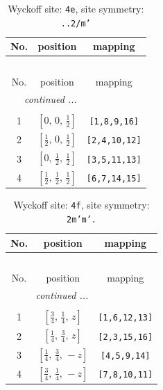 \documentclass[fleqn,8pt]{jsarticle}
\begin{document}
\begin{longtable}{ccc}
\caption{Wyckoff site: {\tt 4e}, site symmetry: {\tt ..2/m'}}
 \\
 \hline \hline
No. & position & mapping \\ \hline \endfirsthead

\multicolumn{2}{l}{\tablename\ \thetable{}} \\
 \hline \hline
No. & position & mapping \\ \hline \endhead

 \hline \hline
\multicolumn{2}{r}{\footnotesize\it continued ...} \\ \endfoot

 \hline \hline
\multicolumn{2}{r}{} \\ \endlastfoot

1 & $\left[ 0,\, 0,\, \frac{1}{2} \right]$ & {\tt [1,8,9,16]} \\ \hline
2 & $\left[ \frac{1}{2},\, 0,\, \frac{1}{2} \right]$ & {\tt [2,4,10,12]} \\ \hline
3 & $\left[ 0,\, \frac{1}{2},\, \frac{1}{2} \right]$ & {\tt [3,5,11,13]} \\ \hline
4 & $\left[ \frac{1}{2},\, \frac{1}{2},\, \frac{1}{2} \right]$ & {\tt [6,7,14,15]} \\
\end{longtable}
\renewcommand{\arraystretch}{1.2}
\begin{longtable}{ccc}
\caption{Wyckoff site: {\tt 4f}, site symmetry: {\tt 2m'm'.}}
 \\
 \hline \hline
No. & position & mapping \\ \hline \endfirsthead

\multicolumn{2}{l}{\tablename\ \thetable{}} \\
 \hline \hline
No. & position & mapping \\ \hline \endhead

 \hline \hline
\multicolumn{2}{r}{\footnotesize\it continued ...} \\ \endfoot

 \hline \hline
\multicolumn{2}{r}{} \\ \endlastfoot

1 & $\left[ \frac{3}{4},\, \frac{1}{4},\, z \right]$ & {\tt [1,6,12,13]} \\ \hline
2 & $\left[ \frac{1}{4},\, \frac{3}{4},\, z \right]$ & {\tt [2,3,15,16]} \\ \hline
3 & $\left[ \frac{1}{4},\, \frac{3}{4},\, - z \right]$ & {\tt [4,5,9,14]} \\ \hline
4 & $\left[ \frac{3}{4},\, \frac{1}{4},\, - z \right]$ & {\tt [7,8,10,11]} \\
\end{longtable}
\end{document}
